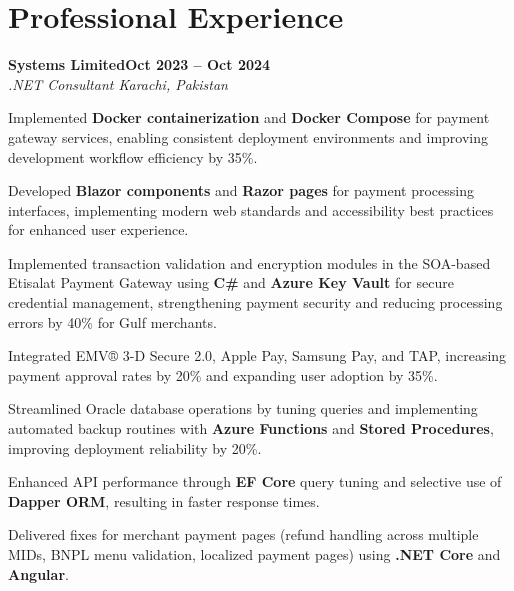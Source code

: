 \documentclass[letterpaper,10pt]{article}
\newcommand{\headingBf}[2]{
  \hspace{10pt}\textbf{#1}\hfill\textbf{#2}\\
}
\newcommand{\headingIt}[2]{
  \hspace{10pt}\textit{#1}\hfill\textit{#2}\\
}
\newenvironment{resume_list}{
  \vspace{-7pt}
  \begin{itemize}[itemsep=-2px, parsep=1pt, leftmargin=30pt]
}{
  \end{itemize}
}
\begin{document}
\section{Professional Experience}

\headingBf{Systems Limited}{Oct 2023 -- Oct 2024}
\headingIt{.NET Consultant \hfill Karachi, Pakistan}{}
\begin{resume_list}
    \item Implemented \textbf{Docker containerization} and \textbf{Docker Compose} for payment gateway services, enabling consistent deployment environments and improving development workflow efficiency by 35\%.
    \item Developed \textbf{Blazor components} and \textbf{Razor pages} for payment processing interfaces, implementing modern web standards and accessibility best practices for enhanced user experience.
    \item Implemented transaction validation and encryption modules in the SOA-based Etisalat Payment Gateway using \textbf{C\#} and \textbf{Azure Key Vault} for secure credential management, strengthening payment security and reducing processing errors by 40\% for Gulf merchants.
    \item Integrated EMV® 3-D Secure 2.0, Apple Pay, Samsung Pay, and TAP, increasing payment approval rates by 20\% and expanding user adoption by 35\%.
    \item Streamlined Oracle database operations by tuning queries and implementing automated backup routines with \textbf{Azure Functions} and \textbf{Stored Procedures}, improving deployment reliability by 20\%.
    \item Enhanced API performance through \textbf{EF Core} query tuning and selective use of \textbf{Dapper ORM}, resulting in faster response times.
    \item Delivered fixes for merchant payment pages (refund handling across multiple MIDs, BNPL menu validation, localized payment pages) using \textbf{.NET Core} and \textbf{Angular}.
\end{resume_list}
\end{document}
